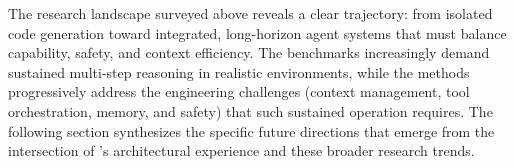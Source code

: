 \medskip
\noindent The research landscape surveyed above reveals a clear trajectory: from isolated code generation toward integrated, long-horizon agent systems that must balance capability, safety, and context efficiency. The benchmarks increasingly demand sustained multi-step reasoning in realistic environments, while the methods progressively address the engineering challenges (context management, tool orchestration, memory, and safety) that such sustained operation requires. The following section synthesizes the specific future directions that emerge from the intersection of \name's architectural experience and these broader research trends.
